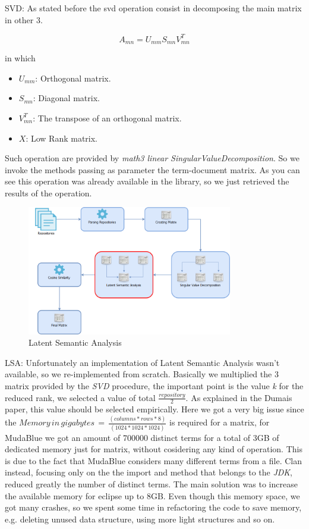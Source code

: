 SVD: As stated before the svd operation consist in decomposing the main matrix in other 3.

\begin{equation}
A_{mn}=U_{mm}S_{mn}V_{mn}^{T}
\end{equation}

in which

\begin{itemize}
	\item $U_{mm}$: Orthogonal matrix.
	\item $S_{mn}$: Diagonal matrix.
	\item $V_{mn}^{T}$: The transpose of an orthogonal matrix.
	\item $X$: Low Rank matrix.
\end{itemize}

Such operation are provided by \emph{math3 linear SingularValueDecomposition}.
So we invoke the methods passing as parameter the term-document matrix.
As you can see this operation was already available in the library, so we just retrieved the results of the operation.

\begin{figure}[!h]
	\centering
	\includegraphics[width=0.8\textwidth]{images/Architecture4.png}
	\caption{Latent Semantic Analysis}
\end{figure}

LSA: Unfortunately an implementation of Latent Semantic Analysis wasn't available, so we re-implemented from scratch.
Basically we multiplied the 3 matrix provided by the \emph{SVD} procedure, the important point is the value \emph{k} for the reduced rank, we selected a value of total $\frac{repository}{2}$. As explained in the Dumais paper, this value should be selected empirically. 
Here we got a very big issue since the
$Memory\,in\,gigabytes\,=\,\frac{(columns*rows*8)}{(1024*1024*1024)}$ is required for a matrix, for MudaBlue we got an amount of 700000 distinct terms for a total of 3GB of dedicated memory just for matrix, without cosidering any kind of operation. This is due to the fact that MudaBlue considers many different terms from a file. Clan instead, focusing only on the the import and method that belongs to the \emph{JDK}, reduced greatly the number of distinct terms. The main solution was to increase the available memory for eclipse up to 8GB. Even though this memory space, we got many crashes, so we spent some time in refactoring the code to save memory, e.g. deleting unused data structure, using more light structures and so on.

